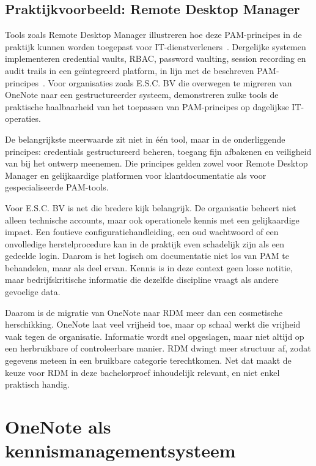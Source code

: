 \subsection{Praktijkvoorbeeld: Remote Desktop Manager}
\label{subsec:rdm-praktijk}

Tools zoals Remote Desktop Manager illustreren hoe deze PAM-principes in de praktijk kunnen worden toegepast voor IT-dienstverleners~\autocite{devolutions2025rdm}. 
Dergelijke systemen implementeren credential vaults, RBAC, password vaulting, session recording en audit trails in een geïntegreerd platform, in lijn met de beschreven PAM-principes~\autocite{souppaya2021pam}. 
Voor organisaties zoals E.S.C. BV die overwegen te migreren van OneNote naar een gestructureerder systeem, demonstreren zulke tools de praktische haalbaarheid van het toepassen van PAM-principes op dagelijkse IT-operaties.

De belangrijkste meerwaarde zit niet in één tool, maar in de onderliggende principes: credentials gestructureerd beheren, toegang fijn afbakenen en veiligheid van bij het ontwerp meenemen.
Die principes gelden zowel voor Remote Desktop Manager en gelijkaardige platformen voor klantdocumentatie als voor gespecialiseerde PAM-tools.

Voor E.S.C. BV is net die bredere kijk belangrijk. De organisatie beheert niet alleen technische accounts, maar ook operationele kennis met een gelijkaardige impact. Een foutieve configuratiehandleiding, een oud wachtwoord of een onvolledige herstelprocedure kan in de praktijk even schadelijk zijn als een gedeelde login. Daarom is het logisch om documentatie niet los van PAM te behandelen, maar als deel ervan. Kennis is in deze context geen losse notitie, maar bedrijfskritische informatie die dezelfde discipline vraagt als andere gevoelige data.

Daarom is de migratie van OneNote naar RDM meer dan een cosmetische herschikking. OneNote laat veel vrijheid toe, maar op schaal werkt die vrijheid vaak tegen de organisatie. Informatie wordt snel opgeslagen, maar niet altijd op een herbruikbare of controleerbare manier. RDM dwingt meer structuur af, zodat gegevens meteen in een bruikbare categorie terechtkomen. Net dat maakt de keuze voor RDM in deze bachelorproef inhoudelijk relevant, en niet enkel praktisch handig.

\section{OneNote als kennismanagementsysteem}
\label{sec:onenote-kennismanagement}

